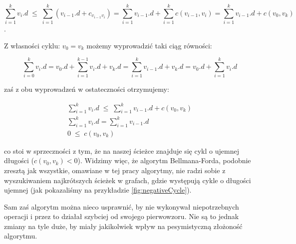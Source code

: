 \begin{equation}
\sum _{i=1}^{k} v_{i}.d \; \leqslant \; \sum _{i=1}^{k} \left( v_{i-1}.d + c_{v_{i-1}v_{i}} \right) = \sum _{i=1}^{k} v_{i-1}.d + \sum _{i=1}^{k} c \left( v_{i-1}, v_{i} \right ) = \sum _{i=1}^{k} v_{i-1}.d + c \left( v_{0} , v_{k} \right)
\end{equation}.

Z własności cyklu: $v_{0} = v_{k}$ możemy wyprowadzić taki ciąg równości:

\begin{equation}
\sum _{i=0}^{k} v_{i}.d = v_{0}.d + \sum _{i=1}^{k-1} v_{i}.d + v_{k}.d = \sum _{i=1}^{k} v_{i-1}.d + v_{k}.d = v_{0}.d + \sum _{i=1}^{k} v_{i}.d
\end{equation}

zaś z obu wyprowadzeń w ostateczności otrzymujemy:

\begin{gather*}
\sum _{i=1}^{k} v_{i}.d \; \leqslant \; \sum _{i=1}^{k} v_{i-1}.d + c \left( v_{0} , v_{k} \right) \\
\sum _{i=1}^{k} v_{i}.d = \sum _{i=1}^{k} v_{i-1}.d \\
0 \; \leqslant \; c \left( v_{0} , v_{k} \right)
\end{gather*}

co stoi w sprzeczności z tym, że na naszej ścieżce znajduje się cykl o ujemnej długości ($ c \left( v_{0}, v_{k} \right) < 0 $). Widzimy więc, że algorytm Bellmana-Forda, podobnie zresztą jak wszystkie, omawiane w tej pracy algorytmy, nie radzi sobie z wyszukiwaniem najkrótszych ścieżek w grafach, gdzie występują cykle o długości ujemnej (jak pokazaliśmy na przykładzie \ref{fig:negativeCycle}).

Sam zaś algorytm można nieco usprawnić, by nie wykonywał niepotrzebnych operacji i przez to działał szybciej od swojego pierwowzoru. Nie są to jednak zmiany na tyle duże, by miały jakikolwiek wpływ na pesymistyczną złożoność algorytmu.

